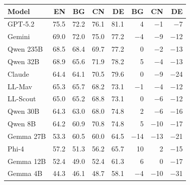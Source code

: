 \begin{minipage}[t]{0.48\textwidth}
\scriptsize
\setlength{\tabcolsep}{2pt}
\label{tab:lang-gap-full}
\begin{tabular}{@{}l rrrr rrr@{}}
\toprule
\textbf{Model} & \textbf{EN} & \textbf{BG} & \textbf{CN} & \textbf{DE} & \textbf{BG} & \textbf{CN} & \textbf{DE} \\
\midrule
GPT-5.2   & 75.5 & 72.2 & 76.1 & 81.1 &  4 & $-$1 & $-$7 \\
Gemini    & 69.0 & 72.0 & 75.0 & 77.2 & $-$4 & $-$9 & $-$12 \\
Qwen 235B & 68.5 & 68.4 & 69.7 & 77.2 &  0 & $-$2 & $-$13 \\
Qwen 32B  & 68.9 & 65.6 & 71.9 & 78.2 &  5 & $-$4 & $-$13 \\
Claude    & 64.4 & 64.1 & 70.5 & 79.6 &  0 & $-$9 & $-$24 \\
LL-Mav    & 65.3 & 65.7 & 68.2 & 73.1 & $-$1 & $-$4 & $-$12 \\
LL-Scout  & 65.0 & 65.2 & 68.8 & 73.1 &  0 & $-$6 & $-$12 \\
Qwen 30B  & 64.3 & 63.0 & 68.0 & 74.8 &  2 & $-$6 & $-$16 \\
Qwen 8B   & 64.2 & 60.9 & 70.8 & 74.8 &  5 & $-$10 & $-$17 \\
Gemma 27B & 53.3 & 60.5 & 60.0 & 64.5 & $-$14 & $-$13 & $-$21 \\
Phi-4     & 57.2 & 51.3 & 56.2 & 65.7 & 10 &  2 & $-$15 \\
Gemma 12B & 52.4 & 49.0 & 52.4 & 61.3 &  6 &  0 & $-$17 \\
Gemma 4B  & 44.3 & 46.1 & 48.7 & 58.1 & $-$4 & $-$10 & $-$31 \\
\bottomrule
\end{tabular}
\end{minipage}

